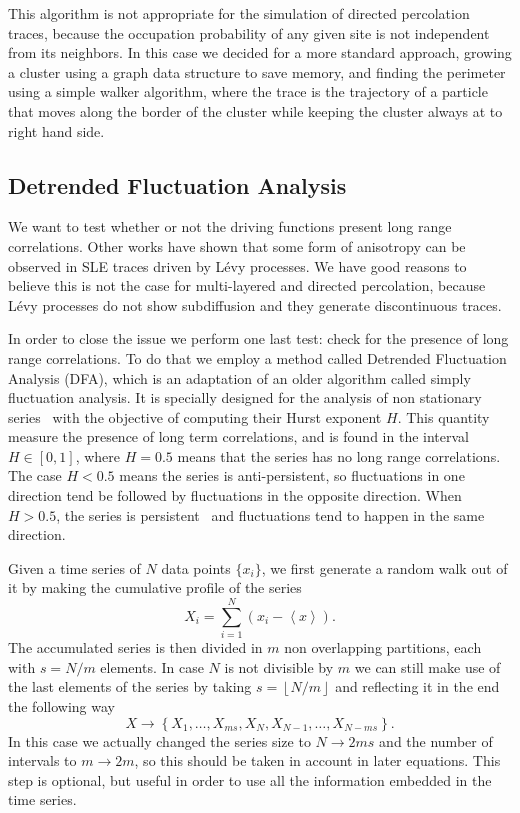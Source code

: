 This algorithm is not appropriate for the simulation of directed percolation
traces, because the occupation probability of any given site is not independent
from its neighbors. In this case we decided for a more standard approach,
growing a cluster using a graph data structure to save memory, and finding the
perimeter using a simple walker algorithm, where the trace is the trajectory of
a particle that moves along the border of the cluster while keeping the cluster
always at to right hand side.

\subsection{Detrended Fluctuation Analysis}
\label{sec:dfa}

We want to test whether or not the driving functions present long range
correlations. Other works have shown that some form of anisotropy can be
observed in SLE traces driven by L\'evy processes. We have good reasons to
believe this is not the case for multi-layered and directed percolation,
because L\'evy processes do not show subdiffusion and they generate
discontinuous traces.

In order to close the issue we perform one last test: check for the presence of
long range correlations. To do that we employ a method called Detrended
Fluctuation Analysis (DFA), which is an adaptation of an older
algorithm called simply fluctuation analysis. It is specially designed for the
analysis of non stationary series~\cite{Peng1993, Hardstone2012} with the
objective of computing their Hurst exponent $H$. This quantity measure the
presence of long term correlations, and is found in the interval $H\in[0,1]$,
where $H=0.5$ means that the series has no long range correlations. The case
$H<0.5$ means the series is anti-persistent, so fluctuations in one direction
tend be followed by fluctuations in the opposite direction. When $H>0.5$, the
series is persistent~\cite{Matos2008} and fluctuations tend to happen in the
same direction.

Given a time series of $N$ data points $\{x_i\}$, we first generate a random walk
out of it by making the cumulative profile of the series
\begin{equation}
    X_i = \sum_{i=1}^{N} \left({x_i - \left\langle x \right\rangle}\right).
\end{equation}
The accumulated series is then divided in $m$ non overlapping partitions, each with
$s = N/m$ elements. In case $N$ is not divisible by $m$ we can still make use
of the last elements of the series by taking $s=\left\lfloor N/m\right\rfloor$
and reflecting it in the end the following way
\begin{equation}
    X\rightarrow\left\{X_1, \ldots, X_{ms},
                       X_{N}, X_{N - 1}, \ldots,
                       X_{N - ms}\right\}.
\end{equation}
In this case we actually changed the series size to $N\rightarrow2ms$ and the
number of intervals to $m\rightarrow2m$, so this should be taken in account in
later equations. This step is optional, but useful in order to use all the
information embedded in the time series.

